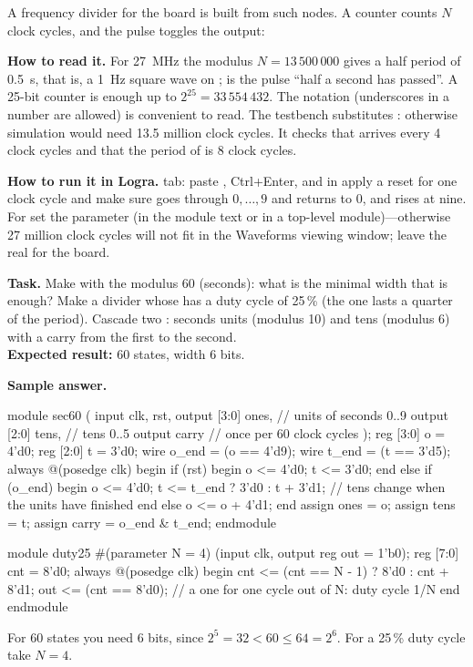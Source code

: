 A frequency divider for the board is built from such nodes. A counter counts $N$
clock cycles, and the pulse toggles the output:


\textbf{How to read it.} For 27~MHz the modulus $N=13\,500\,000$ gives a half
period of 0.5~s, that is, a 1~Hz square wave on ;  is the
pulse ``half a second has passed''. A 25-bit counter  is enough up to
$2^{25}=33\,554\,432$. The notation  (underscores in a number
are allowed) is convenient to read. The testbench 
substitutes : otherwise simulation would need 13.5 million clock
cycles. It checks that  arrives every 4 clock cycles and that the
period of  is 8 clock cycles.

\textbf{How to run it in Logra.}  tab: paste ,
Ctrl+Enter, and in  apply a reset for one clock cycle and make
sure  goes through $0,\ldots,9$ and returns to 0, and  rises at
nine. For  set the parameter  (in the module text or
in a top-level module)---otherwise 27 million clock cycles will not fit in the
Waveforms viewing window; leave the real  for the board.

\begin{diybox}
\textbf{Task.}  Make  with the modulus 60 (seconds): what
is the minimal width  that is enough?  Make a divider whose
 has a duty cycle of 25\,\% (the one lasts a quarter of the period).
 Cascade two : seconds units (modulus 10) and tens
(modulus 6) with a carry from the first to the second.\\
\textbf{Expected result:} 60 states, width 6 bits.
\end{diybox}

\textbf{Sample answer.}
\begin{vcode}
module sec60 (
    input        clk, rst,
    output [3:0] ones,     // units of seconds 0..9
    output [2:0] tens,     // tens 0..5
    output       carry     // once per 60 clock cycles
);
    reg [3:0] o = 4'd0;
    reg [2:0] t = 3'd0;
    wire o_end = (o == 4'd9);
    wire t_end = (t == 3'd5);
    always @(posedge clk) begin
        if (rst) begin o <= 4'd0; t <= 3'd0; end
        else if (o_end) begin
            o <= 4'd0;
            t <= t_end ? 3'd0 : t + 3'd1;    // tens change when the units have finished
        end else o <= o + 4'd1;
    end
    assign ones  = o;
    assign tens  = t;
    assign carry = o_end & t_end;
endmodule

module duty25 #(parameter N = 4) (input clk, output reg out = 1'b0);
    reg [7:0] cnt = 8'd0;
    always @(posedge clk) begin
        cnt <= (cnt == N - 1) ? 8'd0 : cnt + 8'd1;
        out <= (cnt == 8'd0);               // a one for one cycle out of N: duty cycle 1/N
    end
endmodule
\end{vcode}
For 60 states you need 6 bits, since $2^5=32<60\le 64=2^6$. For a 25\,\% duty
cycle take $N=4$.

